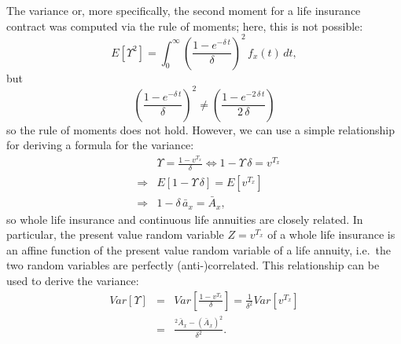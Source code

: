 \documentclass[11pt,fleqn,oneside]{book}
\begin{document}
The variance or, more specifically, the second moment for a life insurance contract was computed via the rule of moments; here, this is not possible:
$$
E[\Upsilon^2] = \int_0^{\infty} \left(\frac{1 - e^{-\delta\,t}}{\delta}\right)^2 \,f_x(t)\,dt,
$$
but 
$$
\left(\frac{1 - e^{-\delta\,t}}{\delta}\right)^2 \neq \left(\frac{1 - e^{-2\,\delta\,t}}{2\,\delta}\right)
$$
so the rule of moments does not hold. However, we can use a simple relationship for deriving a formula for the variance:
\begin{eqnarray}
&& \Upsilon =   \frac{1 - v^{T_x}}{\delta} \Leftrightarrow 1 - \Upsilon\,\delta = v^{T_x} \nonumber \\
&\Rightarrow&   E[1 - \Upsilon\,\delta] = E[v^{T_x}]\nonumber \\
&\Rightarrow&   1 - \delta\,{\bar{a}_x} = {\bar{A}_x}, \label{EQCONLIFEANNREL1}
\end{eqnarray}
so whole life insurance and continuous life annuities are closely related. In particular, the present value random variable $Z=v^{T_x}$ of a whole life insurance is an affine function of the present value random variable of a life annuity, i.e.\ the two random variables are perfectly (anti-)correlated. This relationship can be used to derive the variance:
\begin{eqnarray}
Var[\Upsilon] &=& Var\left[\frac{1-v^{T_x}}{\delta}\right] = \frac{1}{\delta^2} Var\left[v^{T_x}\right] \nonumber \\
&=& \frac{{^2\bar{A}_x} - \left({\bar{A}_x}\right)^2}{\delta^2}. \label{EQCONLIFEANNREL2}
\end{eqnarray}
\end{document}
